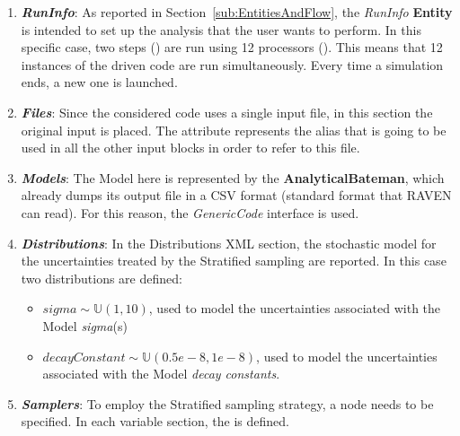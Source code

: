 \begin{enumerate}
   \item \textbf{\textit{RunInfo}}:
   As reported in Section~\ref{sub:EntitiesAndFlow}, the \textit{RunInfo} \textbf{Entity} is intended to set up the analysis
   that the user wants to perform. In this specific case, two steps () are  run
   using 12 processors (). This means that
   12 instances of the driven code are run simultaneously.
   Every time a simulation ends, a new one is launched.
   \item \textbf{\textit{Files}}:
   Since the considered code uses a single input file, in this section the original input is placed.
   The attribute   represents the alias that is going to be used in all the other input blocks in order to refer to this file.
   \item \textbf{\textit{Models}}:
 The Model here is represented by the
 \textbf{AnalyticalBateman}, which already dumps its output file in a
 CSV format (standard format that RAVEN can read). For this reason,
 the \textit{GenericCode} interface is used.
   \item \textbf{\textit{Distributions}}:
  In the Distributions XML section, the stochastic model for the
  uncertainties  treated by the Stratified sampling are reported. In
  this case two distributions are defined:
  \begin{itemize}
    \item $sigma \sim \mathbb{U}(1,10)$, used to model the uncertainties
    associated with  the Model \textit{sigma}(s)
    \item  $decayConstant \sim \mathbb{U}(0.5e-8,1e-8)$,  used to
    model the uncertainties
    associated with  the Model \textit{decay constants}.
  \end{itemize}
   \item \textbf{\textit{Samplers}}:
  To employ the Stratified sampling strategy, a
   node needs to be specified. In each variable section, the   is defined.

\end{enumerate}
